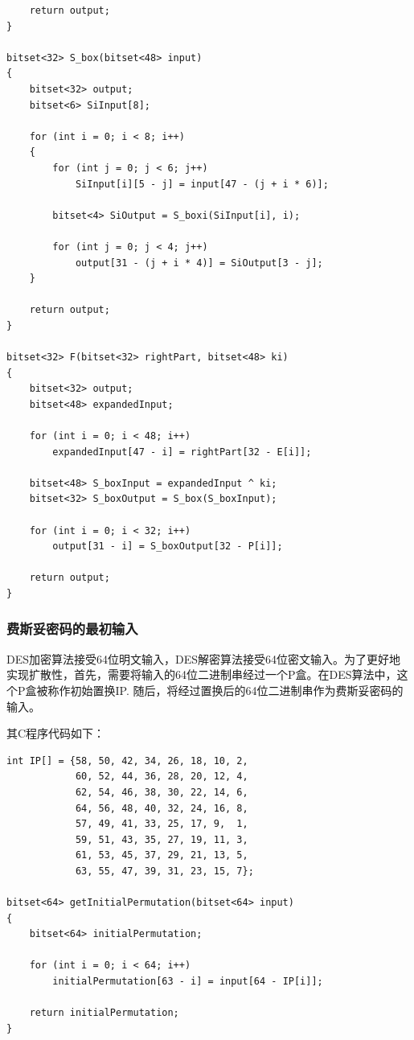 \begin{prove}
\begin{verbatim}
    return output;
}
           
bitset<32> S_box(bitset<48> input)
{
    bitset<32> output;
    bitset<6> SiInput[8];

    for (int i = 0; i < 8; i++)
    {
        for (int j = 0; j < 6; j++)
            SiInput[i][5 - j] = input[47 - (j + i * 6)];

        bitset<4> SiOutput = S_boxi(SiInput[i], i);

        for (int j = 0; j < 4; j++)
            output[31 - (j + i * 4)] = SiOutput[3 - j];
    }

    return output;
}
           
bitset<32> F(bitset<32> rightPart, bitset<48> ki)
{
    bitset<32> output;
    bitset<48> expandedInput;

    for (int i = 0; i < 48; i++)
        expandedInput[47 - i] = rightPart[32 - E[i]];

    bitset<48> S_boxInput = expandedInput ^ ki;
    bitset<32> S_boxOutput = S_box(S_boxInput);

    for (int i = 0; i < 32; i++)
        output[31 - i] = S_boxOutput[32 - P[i]];

    return output;
}
    \end{verbatim}
\end{prove}
\subsubsection{费斯妥密码的最初输入}
DES加密算法接受64位明文输入，DES解密算法接受64位密文输入。为了更好地实现扩散性，首先，需要将输入的64位二进制串经过一个P盒。在DES算法中，这个P盒被称作初始置换IP. 随后，将经过置换后的64位二进制串作为费斯妥密码的输入。\par
其C程序代码如下：
\begin{prove}
    \begin{verbatim}
int IP[] = {58, 50, 42, 34, 26, 18, 10, 2,
            60, 52, 44, 36, 28, 20, 12, 4,
            62, 54, 46, 38, 30, 22, 14, 6,
            64, 56, 48, 40, 32, 24, 16, 8,
            57, 49, 41, 33, 25, 17, 9,  1,
            59, 51, 43, 35, 27, 19, 11, 3,
            61, 53, 45, 37, 29, 21, 13, 5,
            63, 55, 47, 39, 31, 23, 15, 7};

bitset<64> getInitialPermutation(bitset<64> input)
{
    bitset<64> initialPermutation;

    for (int i = 0; i < 64; i++)
        initialPermutation[63 - i] = input[64 - IP[i]];

    return initialPermutation;
}
    \end{verbatim}
\end{prove}
